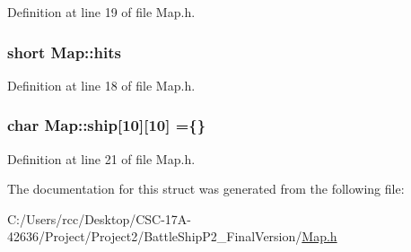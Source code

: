 Definition at line 19 of file Map.\+h.

\subsubsection[{\texorpdfstring{hits}{hits}}]{\setlength{\rightskip}{0pt plus 5cm}short Map\+::hits}\hypertarget{struct_map_a4b81caa9d402a8edc30fb93869e7163e}{}\label{struct_map_a4b81caa9d402a8edc30fb93869e7163e}


Definition at line 18 of file Map.\+h.

\subsubsection[{\texorpdfstring{ship}{ship}}]{\setlength{\rightskip}{0pt plus 5cm}char Map\+::ship\mbox{[}10\mbox{]}\mbox{[}10\mbox{]} =\{\}}\hypertarget{struct_map_a95d68a52f9a8a7c50c45e9ef63fe9a64}{}\label{struct_map_a95d68a52f9a8a7c50c45e9ef63fe9a64}


Definition at line 21 of file Map.\+h.



The documentation for this struct was generated from the following file\+:\begin{DoxyCompactItemize}
\item 
C\+:/\+Users/rcc/\+Desktop/\+C\+S\+C-\/17\+A-\/42636/\+Project/\+Project2/\+Battle\+Ship\+P2\+\_\+\+Final\+Version/\hyperlink{_map_8h}{Map.\+h}\end{DoxyCompactItemize}
